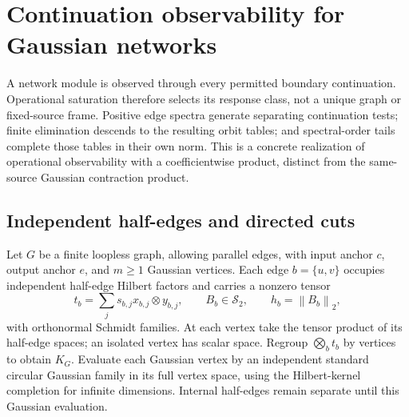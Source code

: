 \documentclass[11pt,a4paper]{amsart}
\numberwithin{equation}{section}
\theoremstyle{definition}
\theoremstyle{remark}
\newcommand{\Sch}{\mathcal S}
\newcommand{\norm}[1]{\left\lVert#1\right\rVert}
\begin{document}
\section{Continuation observability for Gaussian networks}\label{sec:physicalboundary}
A network module is observed through every permitted boundary continuation. Operational saturation therefore selects its response class, not a unique graph or fixed-source frame. Positive edge spectra generate separating continuation tests; finite elimination descends to the resulting orbit tables; and spectral-order tails complete those tables in their own norm. This is a concrete realization of operational observability with a coefficientwise product, distinct from the same-source Gaussian contraction product.

\subsection{Independent half-edges and directed cuts}
Let $G$ be a finite loopless graph, allowing parallel edges, with input anchor $c$, output anchor $e$, and $m\ge1$ Gaussian vertices. Each edge $b=\{u,v\}$ occupies independent half-edge Hilbert factors and carries a nonzero tensor
\[
 t_b=\sum_js_{b,j}x_{b,j}\otimes y_{b,j},\qquad
 B_b\in\Sch_2,\qquad h_b=\norm{B_b}_2,
\]
with orthonormal Schmidt families. At each vertex take the tensor product of its half-edge spaces; an isolated vertex has scalar space. Regroup $\bigotimes_bt_b$ by vertices to obtain $K_G$. Evaluate each Gaussian vertex by an independent standard circular Gaussian family in its full vertex space, using the Hilbert-kernel completion for infinite dimensions. Internal half-edges remain separate until this Gaussian evaluation.
\end{document}
